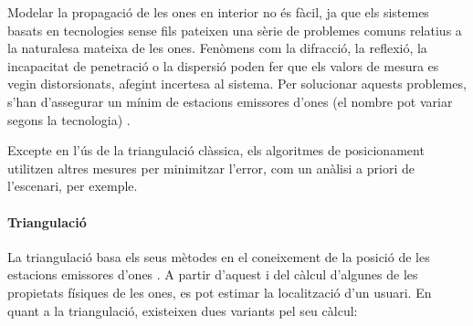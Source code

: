 Modelar la propagació de les ones en interior no és fàcil, ja que els sistemes basats en tecnologies sense fils pateixen una sèrie de problemes comuns relatius a la naturalesa mateixa de les ones. Fenòmens com la difracció, la reflexió, la incapacitat de penetració o la dispersió poden fer que els valors de mesura es vegin distorsionats, afegint incertesa al sistema. Per solucionar aquests problemes, s’han d’assegurar un mínim de estacions emissores d’ones (el nombre pot variar segons la tecnologia) \cite{bagosi}.

Excepte en l'ús de la triangulació clàssica, els algoritmes de posicionament utilitzen altres mesures per minimitzar l'error, com un anàlisi a priori de l'escenari, per exemple.

\paragraph{Triangulació}

La triangulació basa els seus mètodes en el coneixement de la posició de les estacions emissores d’ones \cite{bagosi}. A partir d’aquest i del càlcul d’algunes de les propietats físiques de les ones, es pot estimar la localització d’un usuari. En quant a la triangulació, existeixen dues variants pel seu càlcul:

